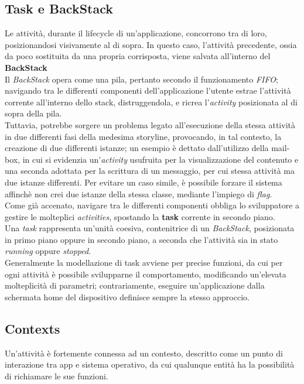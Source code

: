 \documentclass{article}
\begin{document}
\subsection*{Task e BackStack}
Le attività, durante il lifecycle di un'applicazione, concorrono tra di loro, posizionandosi visivamente al di sopra. In questo caso, l'attività precedente, ossia da poco sostituita da una propria corrisposta, viene salvata all'interno del \textbf{BackStack}\vspace*{7pt}\\
Il \textit{BackStack} opera come una pila, pertanto secondo il funzionamento \textit{FIFO}; navigando tra le differenti componenti dell'applicazione l'utente estrae l'attività corrente all'interno dello stack, distruggendola, e ricrea l'\textit{activity} posizionata al di sopra della pila.\vspace*{7pt}\\
Tuttavia, potrebbe sorgere un problema legato all'esecuzione della stessa attività in due differenti fasi della medesima storyline, provocando, in tal contesto, la creazione di due differenti istanze; un esempio è dettato dall'utilizzo della mail-box, in cui si evidenzia un'\textit{activity} usufruita per la visualizzazione del contenuto e una seconda adottata per la scrittura di un messaggio, per cui stessa attività ma due istanze differenti. Per evitare un caso simile, è possibile forzare il sistema affinchè non crei due istanze della stessa classe, mediante l'impiego di \textit{flag}.\vspace*{14pt}\\
Come già accenato, navigare tra le differenti componenti obbliga lo sviluppatore a gestire le molteplici \textit{activities}, spostando la \textbf{task} corrente in secondo piano.\\
Una \textit{task} rappresenta un'unità coesiva, contenitrice di un \textit{BackStack}, posizionata in primo piano oppure in secondo piano, a seconda che l'attività sia in stato \textit{running} oppure \textit{stopped}.\vspace*{7pt}\\
Generalmente la modellazione di task avviene per precise funzioni, da cui per ogni attività è possibile svilupparne il comportamento, modificando un'elevata molteplicità di parametri; contrariamente, eseguire un'applicazione dalla schermata home del dispositivo definisce sempre la stesso approccio.

\subsection*{Contexts}
Un'attività è fortemente connessa ad un contesto, descritto come un punto di interazione tra app e sistema operativo, da cui qualunque entità ha la possibilità di richiamare le sue funzioni.\\
\end{document}
